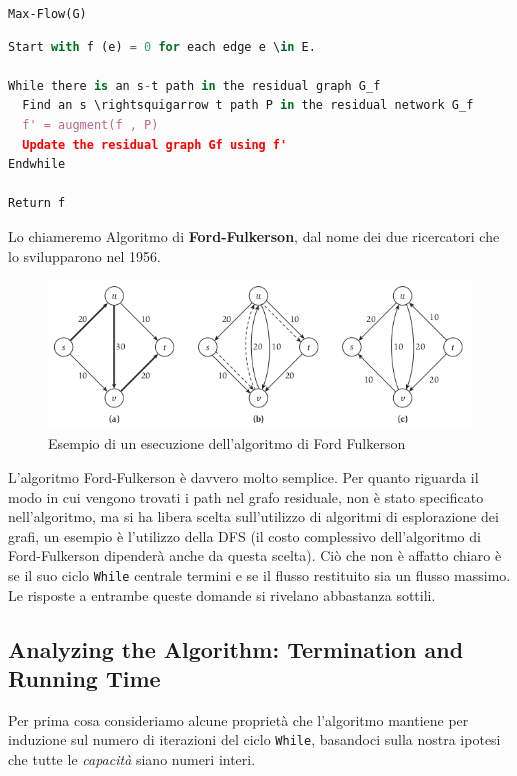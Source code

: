 \texttt{Max-Flow(G)}

\begin{lstlisting}[language=Python, mathescape=true]
Start with f (e) = 0 for each edge e \in E.
  
While there is an s-t path in the residual graph G_f
  Find an s \rightsquigarrow t path P in the residual network G_f
  f' = augment(f , P)
  Update the residual graph Gf using f'
Endwhile

Return f

\end{lstlisting}

Lo chiameremo Algoritmo di \textbf{Ford-Fulkerson}, dal nome dei due
ricercatori che lo svilupparono nel 1956.

\begin{figure}[H]
	\centering
	\includegraphics[width = 12 cm]{capitoli/network_flow/imgs/flow3.png}
	\caption{Esempio di un esecuzione dell'algoritmo di Ford Fulkerson}
\end{figure}

L'algoritmo Ford-Fulkerson è davvero molto semplice. Per quanto riguarda
il modo in cui vengono trovati i path nel grafo residuale, non è stato
specificato nell'algoritmo, ma si ha libera scelta sull'utilizzo di
algoritmi di esplorazione dei grafi, un esempio è l'utilizzo della DFS
(il costo complessivo dell'algoritmo di Ford-Fulkerson dipenderà anche
da questa scelta). Ciò che non è affatto chiaro è se il suo ciclo
\texttt{While} centrale termini e se il flusso restituito sia un flusso
massimo. Le risposte a entrambe queste domande si rivelano abbastanza
sottili.

\subsection{Analyzing the Algorithm: Termination and Running Time}

Per prima cosa consideriamo alcune proprietà che l'algoritmo mantiene
per induzione sul numero di iterazioni del ciclo \texttt{While},
basandoci sulla nostra ipotesi che tutte le \emph{capacità} siano numeri
interi.

